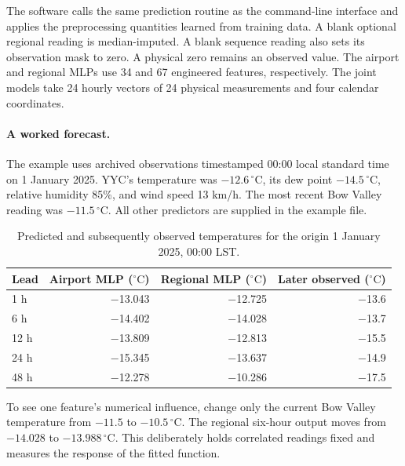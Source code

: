 \documentclass[11pt,letterpaper]{article}
\newcommand{\thead}[1]{\textbf{#1}}\newcommand{\bestscore}[1]{\textbf{#1}}
\newcommand{\celsius}{\ensuremath{^{\circ}\mathrm{C}}}\newcommand{\code}[1]{\texttt{\small #1}}
\begin{document}
The software calls the same prediction routine as the command-line interface and applies the preprocessing quantities learned from training data. A blank optional regional reading is median-imputed. A blank sequence reading also sets its observation mask to zero. A physical zero remains an observed value. The airport and regional MLPs use 34 and 67 engineered features, respectively. The joint models take 24 hourly vectors of 24 physical measurements and four calendar coordinates.
\paragraph{A worked forecast.}
The example uses archived observations timestamped 00:00 local standard time on 1 January 2025. YYC's temperature was $-12.6$\,\celsius{}, its dew point $-14.5$\,\celsius{}, relative humidity 85\%, and wind speed 13 km/h. The most recent Bow Valley reading was $-11.5$\,\celsius. All other predictors are supplied in the example file.


\begin{table}[!htbp]
\centering\small
\caption{Predicted and subsequently observed temperatures for the origin 1 January 2025, 00:00 LST.}\label{tab:example}
\renewcommand{\arraystretch}{1.10}\begin{tabular*}{.94\linewidth}{@{\extracolsep{\fill}}lrrr@{}}\toprule\thead{Lead}&\thead{Airport MLP (\celsius)}&\thead{Regional MLP (\celsius)}&\thead{Later observed (\celsius)}\\\midrule
1 h & −13.043 & −12.725 & −13.6 \\
6 h & −14.402 & −14.028 & −13.7 \\
12 h & −13.809 & −12.813 & −15.5 \\
24 h & −15.345 & −13.637 & −14.9 \\
48 h & −12.278 & −10.286 & −17.5 \\
\bottomrule\end{tabular*}
\end{table}


To see one feature's numerical influence, change only the current Bow Valley temperature from $-11.5$ to $-10.5$\,\celsius{}. The regional six-hour output moves from $-14.028$ to $-13.988$\,\celsius. This deliberately holds correlated readings fixed and measures the response of the fitted function.
\end{document}
